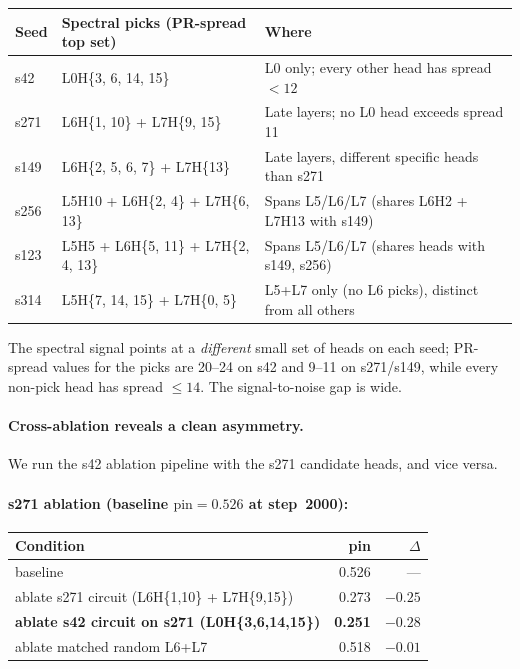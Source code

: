\documentclass[11pt]{article}
\begin{document}
\begin{center}
\small
\begin{tabular}{lll}
\toprule
Seed & Spectral picks (PR-spread top set) & Where \\
\midrule
s42  & L0H\{3, 6, 14, 15\} & L0 only; every other head has spread $< 12$ \\
s271 & L6H\{1, 10\} + L7H\{9, 15\} & Late layers; no L0 head exceeds spread 11 \\
s149 & L6H\{2, 5, 6, 7\} + L7H\{13\} & Late layers, different specific heads than s271 \\
s256 & L5H10 + L6H\{2, 4\} + L7H\{6, 13\} & Spans L5/L6/L7 (shares L6H2 + L7H13 with s149) \\
s123 & L5H5 + L6H\{5, 11\} + L7H\{2, 4, 13\} & Spans L5/L6/L7 (shares heads with s149, s256) \\
s314 & L5H\{7, 14, 15\} + L7H\{0, 5\} & L5+L7 only (no L6 picks), distinct from all others \\
\bottomrule
\end{tabular}
\end{center}

The spectral signal points at a \emph{different} small set of heads on each seed; PR-spread values for the picks are 20--24 on s42 and 9--11 on s271/s149, while every non-pick head has spread $\leq 14$. The signal-to-noise gap is wide.

\paragraph{Cross-ablation reveals a clean asymmetry.} We run the s42 ablation pipeline with the s271 candidate heads, and vice versa.

\paragraph{s271 ablation (baseline $\mathrm{pin}{=}0.526$ at step~2000):}
\begin{center}
\small
\begin{tabular}{lrr}
\toprule
Condition & pin & $\Delta$ \\
\midrule
baseline                                                & 0.526 & --- \\
ablate s271 circuit (L6H\{1,10\} + L7H\{9,15\})         & 0.273 & $-0.25$ \\
\textbf{ablate s42 circuit on s271 (L0H\{3,6,14,15\})}  & \textbf{0.251} & \textbf{$-0.28$} \\
ablate matched random L6+L7                             & 0.518 & $-0.01$ \\
\bottomrule
\end{tabular}
\end{center}
\end{document}
